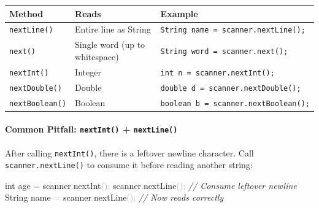 \documentclass[
  justified,
  openright,
]{tufte-book}
\let\subsection\paragraph
\let\paragraph\paragraph
\newcommand{\CommentTok}[1]{\textcolor{CodeComment}{\textit{#1}}}  %
\newcommand{\CodeFuncTok}[1]{\textcolor{CodeKeyword}{#1}}           %
\newcommand{\CodeTypeTok}[1]{\textcolor{CodeType}{#1}}              %
\newcommand{\OperatorTok}[1]{\textcolor{DarkGray}{#1}}              %
\newenvironment{Shaded}{%
  \begin{mdframed}[style=TufteCode]%
}{%
  \end{mdframed}%
}
\let\subsection\paragraph
\let\paragraph\paragraph
\begin{document}
\begin{fullwidth}{\def\LTcaptype{none} %
\begin{longtable}[]{@{}
  >{\raggedright\arraybackslash}p{}
  >{\raggedright\arraybackslash}p{}
  >{\raggedright\arraybackslash}p{}@{}}
\toprule\noalign{}
\begin{minipage}[b]{\linewidth}\raggedright
Method
\end{minipage} & \begin{minipage}[b]{\linewidth}\raggedright
Reads
\end{minipage} & \begin{minipage}[b]{\linewidth}\raggedright
Example
\end{minipage} \\
\midrule\noalign{}
\endhead
\bottomrule\noalign{}
\endlastfoot
\texttt{nextLine()} & Entire line as String &
\texttt{String\ name\ =\ scanner.nextLine();} \\
\texttt{next()} & Single word (up to whitespace) &
\texttt{String\ word\ =\ scanner.next();} \\
\texttt{nextInt()} & Integer & \texttt{int\ n\ =\ scanner.nextInt();} \\
\texttt{nextDouble()} & Double &
\texttt{double\ d\ =\ scanner.nextDouble();} \\
\texttt{nextBoolean()} & Boolean &
\texttt{boolean\ b\ =\ scanner.nextBoolean();} \\
\end{longtable}
}
\end{fullwidth}

\subsection{\texorpdfstring{Common Pitfall: \texttt{nextInt()} +
\texttt{nextLine()}}{Common Pitfall: nextInt() + nextLine()}}\label{common-pitfall-nextint-nextline}

After calling \texttt{nextInt()}, there is a leftover newline character.
Call \texttt{scanner.nextLine()} to consume it before reading another
string:

\begin{Shaded}
\begin{Highlighting}[]
\CodeTypeTok{int} age \OperatorTok{=} scanner\OperatorTok{.}\CodeFuncTok{nextInt}\OperatorTok{();}
scanner\OperatorTok{.}\CodeFuncTok{nextLine}\OperatorTok{();}            \CommentTok{// Consume leftover newline}
String name \OperatorTok{=} scanner\OperatorTok{.}\CodeFuncTok{nextLine}\OperatorTok{();}  \CommentTok{// Now reads correctly}
\end{Highlighting}
\end{Shaded}
\end{document}
